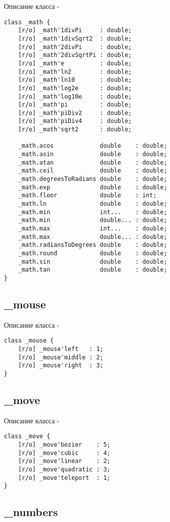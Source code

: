 \noindent Описание класса  -
\begin{lstlisting}[numbers=none]
class _math {
	[r/o] _math'1divPi     : double;
	[r/o] _math'1divSqrt2  : double;
	[r/o] _math'2divPi     : double;
	[r/o] _math'2divSqrtPi : double;
	[r/o] _math'e          : double;
	[r/o] _math'ln2        : double;
	[r/o] _math'ln10       : double;
	[r/o] _math'log2e      : double;
	[r/o] _math'log10e     : double;
	[r/o] _math'pi         : double;
	[r/o] _math'piDiv2     : double;
	[r/o] _math'piDiv4     : double;
	[r/o] _math'sqrt2      : double;
	
	_math.acos             double    : double;
	_math.asin             double    : double;
	_math.atan             double    : double;
	_math.ceil             double    : double;
	_math.degreesToRadians double    : double;
	_math.exp              double    : double;
	_math.floor            double    : int;
	_math.ln               double    : double;
	_math.min              int...    : double;
	_math.min              double... : double;
	_math.max              int...    : double;
	_math.max              double... : double;
	_math.radiansToDegrees double    : double;
	_math.round            double    : double;
	_math.sin              double    : double;
	_math.tan              double    : double;
}
\end{lstlisting}

\subsection{{\color{orange} \_mouse}}

\noindent Описание класса  -
\begin{lstlisting}[numbers=none]
class _mouse {
	[r/o] _mouse'left   : 1;
	[r/o] _mouse'middle : 2;
	[r/o] _mouse'right  : 3;
}
\end{lstlisting}

\subsection{{\color{orange} \_move}}

\noindent Описание класса  -
\begin{lstlisting}[numbers=none]
class _move {
	[r/o] _move'bezier    : 5;
	[r/o] _move'cubic     : 4;
	[r/o] _move'linear    : 2;
	[r/o] _move'quadratic : 3;
	[r/o] _move'teleport  : 1;
}
\end{lstlisting}

\subsection{{\color{orange} \_numbers}}

